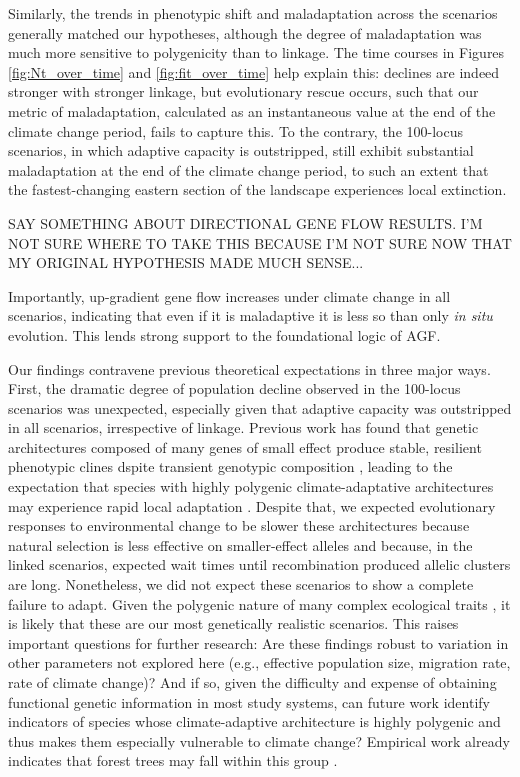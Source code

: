 \documentclass[9pt,twocolumn,twoside,lineno]{pnas-new}
\begin{document}
Similarly, the trends in phenotypic shift and maladaptation
across the scenarios generally matched our hypotheses,
although the degree of maladaptation was much more sensitive to
polygenicity than to linkage.
The time courses in Figures \ref{fig:Nt_over_time} and \ref{fig:fit_over_time} help explain this: declines
are indeed stronger with stronger linkage, but evolutionary
rescue occurs, such that our metric of maladaptation,
calculated as an instantaneous value 
at the end of the climate change period,
fails to capture this.
To the contrary, the 100-locus scenarios,
in which adaptive capacity is outstripped,
still exhibit substantial maladaptation at the end of the climate
change period, to such an extent that the fastest-changing
eastern section of the landscape experiences local extinction.


SAY SOMETHING ABOUT DIRECTIONAL GENE FLOW RESULTS. I'M NOT SURE WHERE TO TAKE THIS BECAUSE
I'M NOT SURE NOW THAT MY ORIGINAL HYPOTHESIS MADE MUCH SENSE...

Importantly, up-gradient gene flow increases under climate change in all scenarios,
indicating that even if it is maladaptive it is less so than only \textit{in situ} evolution.
This lends strong support to the foundational logic of AGF.


Our findings contravene previous theoretical expectations in
three major ways.
First, the dramatic degree of population decline observed in the 100-locus scenarios was unexpected,
especially given that adaptive capacity was outstripped in all scenarios, irrespective of 
linkage.
Previous work has found that genetic architectures composed
of many genes of small effect produce stable, resilient phenotypic clines dspite transient genotypic composition \cite{yeaman_amnat,yeaman_review},
leading to the expectation that species with highly polygenic climate-adaptative architectures 
may experience rapid local adaptation \cite{aitken_yeaman}. 
Despite that, we expected evolutionary responses to environmental change
to be slower these architectures
because natural selection is less effective on smaller-effect alleles
and because, in the linked scenarios,
expected wait times until recombination produced allelic clusters are long.
Nonetheless, we did not expect these scenarios to show a complete failure to adapt.
Given the polygenic nature of many complex ecological traits \cite{barghi_polygenic,boyle,rockman,savolainen,sella},
it is likely that these are our most genetically realistic scenarios.
This raises important questions for further research:
Are these findings robust to variation in other parameters
not explored here (e.g., effective population size, migration rate, rate of climate change)? 
And if so,
given the difficulty and expense of obtaining functional genetic
information in most study systems,
can future work identify indicators of species whose
climate-adaptive architecture is highly polygenic
and thus makes them especially vulnerable to climate change?
Empirical work already indicates
that forest trees may fall within this group
\cite{lind,aitken_yeaman}.
\end{document}
